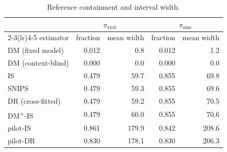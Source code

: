 \begin{table}[!htbp]
\centering
\caption{Reference containment and interval width.}
\label{tab:coverage}
\footnotesize
\begin{tabular}{lrrrr}
\toprule
& \multicolumn{2}{c}{$\pi_{\mathrm{visit}}$} & \multicolumn{2}{c}{$\pi_{\mathrm{sms}}$} \\
\cmidrule(lr){2-3}\cmidrule(lr){4-5}
estimator & fraction & mean width & fraction & mean width \\
\midrule
DM (fixed model) & 0.012 & 0.8 & 0.012 & 1.2 \\
DM (context-blind) & 0.000 & 0.0 & 0.000 & 0.0 \\
IS & 0.479 & 59.7 & 0.855 & 69.8 \\
SNIPS & 0.479 & 59.3 & 0.855 & 69.6 \\
DR (cross-fitted) & 0.479 & 59.2 & 0.855 & 70.5 \\
DM\textsuperscript{+}-IS & 0.479 & 60.0 & 0.855 & 70.6 \\
pilot-IS & 0.861 & 179.9 & 0.842 & 208.6 \\
pilot-DR & 0.830 & 178.1 & 0.830 & 206.3 \\
\bottomrule
\end{tabular}
\end{table}
